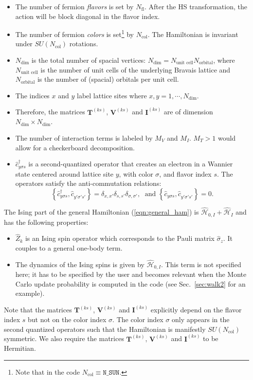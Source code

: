 \begin{itemize}
\item The number of fermion \emph{flavors} is set by $N_{\mathrm{fl}}$.  After the HS transformation, the action will be block diagonal in the flavor index. 
\item The number of fermion \emph{colors} is set\footnote{Note that  in the code $ N_{\mathrm{col}} \equiv \texttt{N\_{SUN}} $.} by $N_{\mathrm{col}}$.    The Hamiltonian is invariant under  $SU(N_{\mathrm{col}})$  rotations. 
\item $N_{\mathrm{dim}}$ is the total number of spacial vertices: $N_{\mathrm{dim}}=N_{\text{unit cell}} N_{\mathrm{orbital}}$, 
where $N_{\text{unit cell}}$ is the number of unit cells of the underlying Bravais lattice and $N_{\mathrm{orbital}}$ is the number of (spacial) orbitals per unit cell.
\item The indices $x$ and $y$ label lattice sites where $x,y=1,\cdots, N_{\mathrm{dim}}$. 
\item Therefore, the  matrices $\bm{T}^{(k s)}$, $\bm{V}^{(ks)}$  and $\bm{I}^{(ks)}$ are  of dimension $N_{\mathrm{dim}}\times N_{\mathrm{dim}}$.
\item The number of interaction terms  is labeled by $M_V$   and $M_I$.   $M_T> 1 $ would allow for a checkerboard decomposition.
\item $\hat{c}^{\dagger}_{y \sigma s} $ is a second-quantized operator that creates an electron in a Wannier state centered around lattice site $y$, with color $\sigma$, and  flavor index $s$.  The operators satisfy the anti-commutation relations: 
\begin{equation}
	\left\{ \hat{c}^{\dagger}_{y \sigma s},    \hat{c}^{\phantom\dagger}_{y' \sigma' s'}  \right\}   =   \delta_{x,x'}  \delta_{s,s'} \delta_{\sigma,\sigma'},   
	\; \text{ and } \left\{ \hat{c}^{\phantom\dagger}_{y \sigma s},    \hat{c}^{\phantom\dagger}_{y' \sigma' s'}  \right\}   =0.
\end{equation}

\end{itemize}
The Ising part of the general Hamiltonian (\ref{eqn:general_ham}) is $\hat{\mathcal{H}}_{0,I}+ \hat{\mathcal{H}}_{I}$ and  has the following properties:
\begin{itemize}
\item $\hat{Z}_k$ is an Ising spin operator which corresponds to the Pauli matrix $\hat{\sigma}_{z}$. It couples to a general one-body term. 
\item  The dynamics of the Ising spins is given by $\hat{\mathcal{H}}_{0,I}$. This term is not specified here; 
it has to be specified by the user and becomes relevant when the Monte Carlo update probability is computed in the code (see Sec.~\ref{sec:walk2} for an example).
\end{itemize}
Note that the matrices  $\bm{T}^{(ks)}$,  $\bm{V}^{(ks)}$ and  $\bm{I}^{(ks)}$ explicitly depend on the flavor index $s$ but not on the color index $\sigma$. 
The color index $\sigma$ only appears in  the  second quantized operators such that the Hamiltonian is manifestly $SU(N_{\mathrm{col}})$    symmetric.  We also require
the matrices $\bm{T}^{(ks)}$,  $\bm{V}^{(ks)}$ and  $\bm{I}^{(ks)}$  to be  Hermitian.

